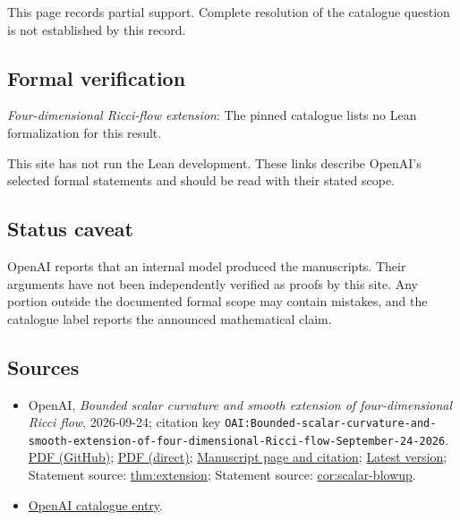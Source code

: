 \documentclass[11pt]{article}
\begin{document}
This page records partial support. Complete resolution of the catalogue question is not established by this record.

\subsection{Formal verification}
\textit{Four-dimensional Ricci-flow extension}: The pinned catalogue lists no Lean formalization for this result.

This site has not run the Lean development. These links describe OpenAI’s selected formal statements and should be read with their stated scope.

\subsection{Status caveat}
OpenAI reports that an internal model produced the manuscripts. Their arguments have not been independently verified as proofs by this site. Any portion outside the documented formal scope may contain mistakes, and the catalogue label reports the announced mathematical claim.

\subsection{Sources}
\begin{itemize}
\item OpenAI, \emph{Bounded scalar curvature and smooth extension of four-dimensional Ricci flow}, 2026-09-24; citation key \texttt{OAI:Bounded-scalar-curvature-and-smooth-extension-of-four-dimensional-Ricci-flow-September-24-2026}. \href{https://github.com/openai/math/blob/adc7f1241b42e322a6451854ab7e4b4c146bf78a/preprints/Bounded-scalar-curvature-and-smooth-extension-of-four-dimensional-Ricci-flow-September-24-2026/paper.pdf}{PDF (GitHub)}; \href{https://github.com/openai/math/raw/adc7f1241b42e322a6451854ab7e4b4c146bf78a/preprints/Bounded-scalar-curvature-and-smooth-extension-of-four-dimensional-Ricci-flow-September-24-2026/paper.pdf}{PDF (direct)}; \href{https://github.com/openai/math/blob/adc7f1241b42e322a6451854ab7e4b4c146bf78a/preprints/Bounded-scalar-curvature-and-smooth-extension-of-four-dimensional-Ricci-flow-September-24-2026/README.md}{Manuscript page and citation}; \href{https://github.com/openai/math/blob/main/preprints/Bounded-scalar-curvature-and-smooth-extension-of-four-dimensional-Ricci-flow-September-24-2026/paper.pdf}{Latest version}; Statement source: \href{https://github.com/openai/math/blob/adc7f1241b42e322a6451854ab7e4b4c146bf78a/preprints/Bounded-scalar-curvature-and-smooth-extension-of-four-dimensional-Ricci-flow-September-24-2026/build/sections/01-introduction.tex\#L11}{thm:extension}; Statement source: \href{https://github.com/openai/math/blob/adc7f1241b42e322a6451854ab7e4b4c146bf78a/preprints/Bounded-scalar-curvature-and-smooth-extension-of-four-dimensional-Ricci-flow-September-24-2026/build/sections/01-introduction.tex\#L31}{cor:scalar-blowup}.
\item \href{https://github.com/openai/math/blob/adc7f1241b42e322a6451854ab7e4b4c146bf78a/CONTENTS.md}{OpenAI catalogue entry}.
\end{itemize}
\end{document}
